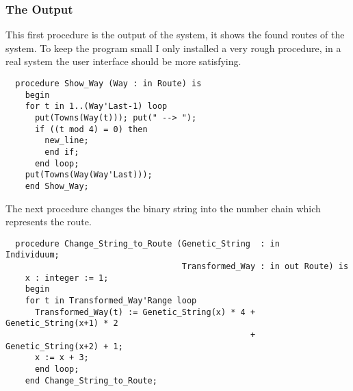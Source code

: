 \subsubsection{The Output}
This first procedure is the output of the system, it shows the found routes of
the system. To keep the program small I only installed a very rough procedure, in
a real system the user interface should be more satisfying.
\begin{verbatim}
  procedure Show_Way (Way : in Route) is
    begin
    for t in 1..(Way'Last-1) loop
      put(Towns(Way(t))); put(" --> ");
      if ((t mod 4) = 0) then
        new_line;
        end if;
      end loop;
    put(Towns(Way(Way'Last)));
    end Show_Way;
\end{verbatim}
The next procedure changes the binary string into the number chain which represents
the route.
\begin{verbatim}
  procedure Change_String_to_Route (Genetic_String  : in     Individuum;
                                    Transformed_Way : in out Route) is
    x : integer := 1;
    begin
    for t in Transformed_Way'Range loop
      Transformed_Way(t) := Genetic_String(x) * 4 + Genetic_String(x+1) * 2
                                                  + Genetic_String(x+2) + 1;
      x := x + 3;
      end loop;
    end Change_String_to_Route;
\end{verbatim}
